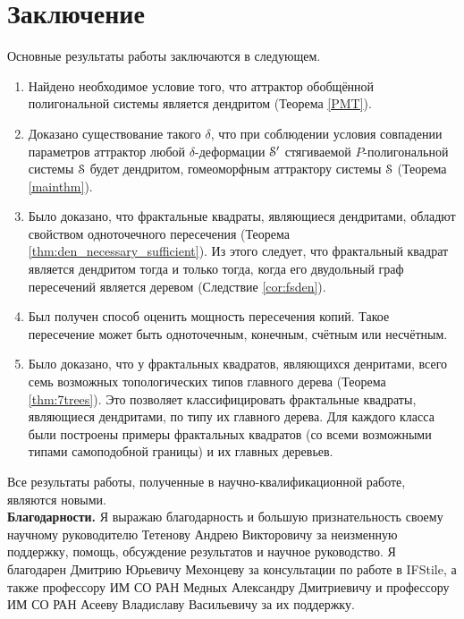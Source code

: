 \chapter*{Заключение}                       %


Основные результаты работы заключаются в следующем.

\begin{enumerate}
\item Найдено необходимое условие того, что аттрактор обобщённой полигональной системы является дендритом (Теорема \ref{PMT}). 

\item Доказано существование такого $\delta$, что при соблюдении условия совпадении параметров аттрактор любой $\delta$-деформации ${\EuScript S}'$ стягиваемой $P$-полигональной системы ${\EuScript S}$ будет дендритом, гомеоморфным аттрактору системы ${\EuScript S}$ (Теорема \ref{mainthm}).



\item Было доказано, что фрактальные квадраты, являющиеся дендритами, обладют свойством одноточечного пересечения (Теорема \ref{thm:den_necessary_sufficient}).
Из этого следует, что фрактальный квадрат является дендритом тогда и только тогда, когда его двудольный граф пересечений является деревом (Следствие \ref{cor:fsden}).

\item Был получен способ оценить мощность пересечения копий.
Такое пересечение может быть одноточечным, конечным, счётным или несчётным.

\item Было доказано, что у фрактальных квадратов, являющихся денритами, всего семь возможных топологических типов главного дерева (Теорема \ref{thm:7trees}).
Это позволяет классифицировать фрактальные квадраты, являющиеся дендритами, по типу их главного дерева.
Для каждого класса были построены примеры фрактальных квадратов (со всеми возможными типами самоподобной границы) и их главных деревьев.
\end{enumerate}

Все результаты работы, полученные в научно-квалификационной работе, являются новыми.
\\

\textbf{Благодарности.}
Я выражаю благодарность и большую признательность своему научному руководителю
Тетенову Андрею Викторовичу за неизменную поддержку, помощь, обсуждение результатов и научное
руководство.
Я благодарен Дмитрию Юрьевичу Мехонцеву за консультации по работе в IFStile, а также профессору ИМ СО РАН Медных Александру Дмитриевичу и профессору ИМ СО РАН Асееву Владиславу Васильевичу за их поддержку.